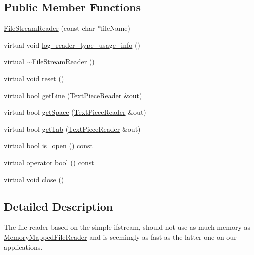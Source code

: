 \subsection*{Public Member Functions}
\begin{DoxyCompactItemize}
\item 
\hyperlink{classuva_1_1smt_1_1file_1_1_file_stream_reader_a2e760fb9dc365a1bc5cbf88fa3468f16}{File\+Stream\+Reader} (const char $\ast$file\+Name)
\item 
virtual void \hyperlink{classuva_1_1smt_1_1file_1_1_file_stream_reader_a55d60d5147bcd74211b94df3e65b1842}{log\+\_\+reader\+\_\+type\+\_\+usage\+\_\+info} ()
\item 
virtual \hyperlink{classuva_1_1smt_1_1file_1_1_file_stream_reader_a32041ffe2a5e2c234d200efcd373c214}{$\sim$\+File\+Stream\+Reader} ()
\item 
virtual void \hyperlink{classuva_1_1smt_1_1file_1_1_file_stream_reader_a7133c0c667201d26a10145449b295430}{reset} ()
\item 
virtual bool \hyperlink{classuva_1_1smt_1_1file_1_1_file_stream_reader_ac108ff70ae402305364372d801492931}{get\+Line} (\hyperlink{classuva_1_1smt_1_1file_1_1_text_piece_reader}{Text\+Piece\+Reader} \&out)
\item 
virtual bool \hyperlink{classuva_1_1smt_1_1file_1_1_file_stream_reader_a74028d5f28fcf0db4b7e762c82bc4953}{get\+Space} (\hyperlink{classuva_1_1smt_1_1file_1_1_text_piece_reader}{Text\+Piece\+Reader} \&out)
\item 
virtual bool \hyperlink{classuva_1_1smt_1_1file_1_1_file_stream_reader_a73d742ebfd09d66302bd2220fb622201}{get\+Tab} (\hyperlink{classuva_1_1smt_1_1file_1_1_text_piece_reader}{Text\+Piece\+Reader} \&out)
\item 
virtual bool \hyperlink{classuva_1_1smt_1_1file_1_1_file_stream_reader_a11abd8b7161e0be3b7ef7c6124666e58}{is\+\_\+open} () const 
\item 
virtual \hyperlink{classuva_1_1smt_1_1file_1_1_file_stream_reader_a31499820e692892528421e4923262cf6}{operator bool} () const 
\item 
virtual void \hyperlink{classuva_1_1smt_1_1file_1_1_file_stream_reader_a5fb02c64d5576c7c8c08e691d45d73e3}{close} ()
\end{DoxyCompactItemize}


\subsection{Detailed Description}
The file reader based on the simple ifstream, should not use as much memory as \hyperlink{classuva_1_1smt_1_1file_1_1_memory_mapped_file_reader}{Memory\+Mapped\+File\+Reader} and is seemingly as fast as the latter one on our applications. 

